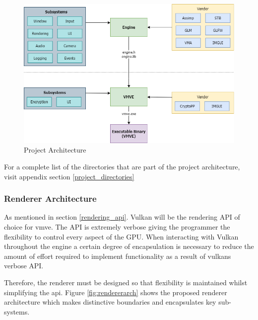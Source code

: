 \documentclass[11pt]{article}
\begin{document}
\begin{figure}[H]
  \centering
  \includegraphics[width=\textwidth]{images/project_architecture.png}
  \caption{Project Architecture}
  \label{fig:projarch}
\end{figure}

For a complete list of the directories that are part of the project
architecture, visit appendix section \ref{project_directories}

\subsubsection{Renderer Architecture} \label{renderer_architecture}
As mentioned in section \ref{rendering_api}. Vulkan will be the rendering API of
choice for \gls*{vmve}. The API is extremely verbose giving the programmer the
flexibility to control every aspect of the GPU. When interacting with Vulkan
throughout the engine a certain degree of encapsulation is necessary to reduce
the amount of effort required to implement functionality as a result of
\glspl*{vulkan} verbose API.

Therefore, the renderer must be designed so that flexibility is maintained
whilst simplifying the \gls*{api}. Figure \ref{fig:rendererarch} shows the
proposed renderer architecture which makes distinctive boundaries and
encapsulates key sub-systems.
\end{document}
